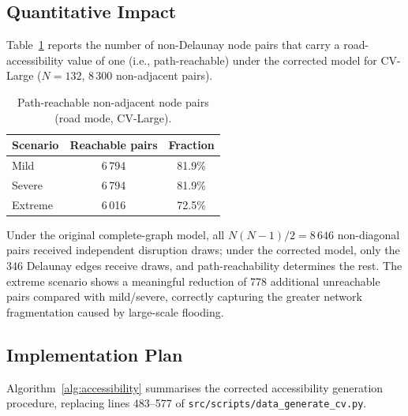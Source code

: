 \documentclass{llncs}
\begin{document}
\subsection{Quantitative Impact}
\label{sec:impact}

Table~\ref{tab:access} reports the number of non-Delaunay node pairs that
carry a road-accessibility value of one (i.e., path-reachable) under the
corrected model for CV-Large ($N=132$, 8\,300 non-adjacent pairs).

\begin{table}[h]
\centering
\caption{Path-reachable non-adjacent node pairs (road mode, CV-Large).}
\label{tab:access}
\begin{tabular}{lcc}
\toprule
Scenario & Reachable pairs & Fraction \\
\midrule
Mild    & 6\,794 & 81.9\% \\
Severe  & 6\,794 & 81.9\% \\
Extreme & 6\,016 & 72.5\% \\
\bottomrule
\end{tabular}
\end{table}

Under the original complete-graph model, all $N(N-1)/2 = 8\,646$ non-diagonal
pairs received independent disruption draws; under the corrected model, only
the 346 Delaunay edges receive draws, and path-reachability determines the
rest.
The extreme scenario shows a meaningful reduction of 778 additional
unreachable pairs compared with mild/severe, correctly capturing the greater
network fragmentation caused by large-scale flooding.


\subsection{Implementation Plan}
\label{sec:impl}

Algorithm~\ref{alg:accessibility} summarises the corrected accessibility
generation procedure, replacing lines 483--577 of
\texttt{src/scripts/data\_generate\_cv.py}.
\end{document}
